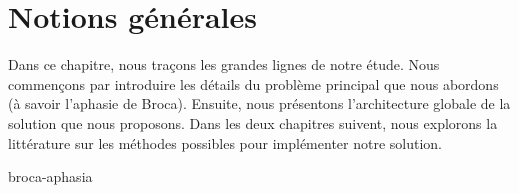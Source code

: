 \chapter{Notions générales}

Dans ce chapitre, nous traçons les grandes lignes de notre étude.
Nous commençons par introduire les détails du problème principal que nous abordons 
(à savoir l'aphasie de Broca).
Ensuite, nous présentons l'architecture globale de la solution que nous proposons.
Dans les deux chapitres suivent, 
nous explorons la littérature sur les méthodes possibles pour implémenter notre solution.

{broca-aphasia}